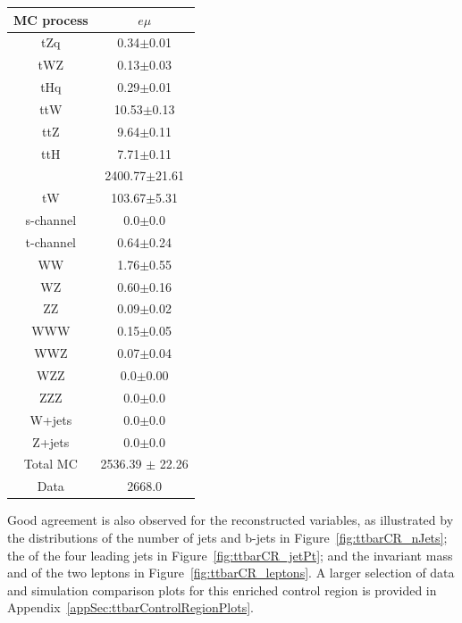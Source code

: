\begin{table}[h]
\label{tab:ttbarCR}
  \centering
 \begin{tabular}{cc}
   \hline
   \textbf{MC process} & \textbf{$e\mu$}  \\
   \hline
	tZq & 0.34$\pm$0.01  \\ 
	tWZ & 0.13$\pm$0.03 \\ 
	tHq & 0.29$\pm$0.01  \\ 
	ttW & 10.53$\pm$0.13   \\
	ttZ & 9.64$\pm$0.11   \\ 
	ttH & 7.71$\pm$0.11  \\ 
	\ttbar & 2400.77$\pm$21.61   \\ 
	tW & 103.67$\pm$5.31   \\ 
	s-channel & 0.0$\pm$0.0 \\  
	t-channel & 0.64$\pm$0.24 \\ 
	WW & 1.76$\pm$0.55  \\ 
	WZ & 0.60$\pm$0.16 \\ 
	ZZ & 0.09$\pm$0.02 \\ 
	WWW & 0.15$\pm$0.05     \\ 
	WWZ & 0.07$\pm$0.04     \\ 
	WZZ & 0.0$\pm$0.00     \\ 
	ZZZ & 0.0$\pm$0.0     \\ 
	W+jets & 0.0$\pm$0.0     \\ 
	Z+jets & 0.0$\pm$0.0     \\ 
	\hline
	Total MC & 2536.39 $\pm$ 22.26     \\ 
	\hline
	Data & 2668.0     \\ 
   \hline
 \end{tabular}
\end{table}

Good agreement is also observed for the reconstructed variables, as illustrated by the distributions of the number of jets and b-jets in Figure~\ref{fig:ttbarCR_nJets}; the \pT of the four leading jets in Figure~\ref{fig:ttbarCR_jetPt}; and the invariant mass and \pT of the two leptons in Figure~\ref{fig:ttbarCR_leptons}.
A larger selection of data and simulation comparison plots for this \ttbar enriched control region is provided in Appendix~\ref{appSec:ttbarControlRegionPlots}.

